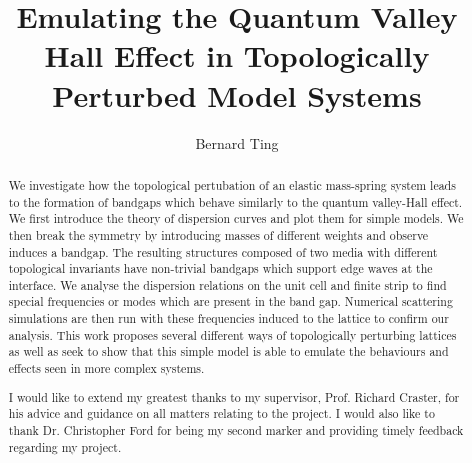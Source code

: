 \documentclass[a4paper, twoside]{report}
\title{Emulating the Quantum Valley Hall Effect in Topologically Perturbed Model Systems}
\author{Bernard Ting}
\begin{document}


\begin{abstract}
We investigate how the topological pertubation of an elastic mass-spring system
leads to the formation of bandgaps which behave similarly to the quantum
valley-Hall effect. We first introduce the theory of dispersion curves and plot
them for simple models. We then break the symmetry by introducing masses of
different weights and observe induces a bandgap. The resulting structures
composed of two media with different topological invariants have non-trivial
bandgaps which support edge waves at the interface. We analyse the dispersion
relations on the unit cell and finite strip to find special frequencies or
modes which are present in the band gap. Numerical scattering simulations are
then run with these frequencies induced to the lattice to confirm our analysis.
This work proposes several different ways of topologically perturbing lattices
as well as seek to show that this simple model is able to emulate the
behaviours and effects seen in more complex systems.
\end{abstract}

\renewcommand{\abstractname}{Acknowledgements}
\begin{abstract}
I would like to extend my greatest thanks to my supervisor, Prof. Richard
Craster, for his advice and guidance on all matters relating to the project. I
would also like to thank Dr. Christopher Ford for being my second marker and
providing timely feedback regarding my project.
\end{abstract}

\tableofcontents












\end{document}
